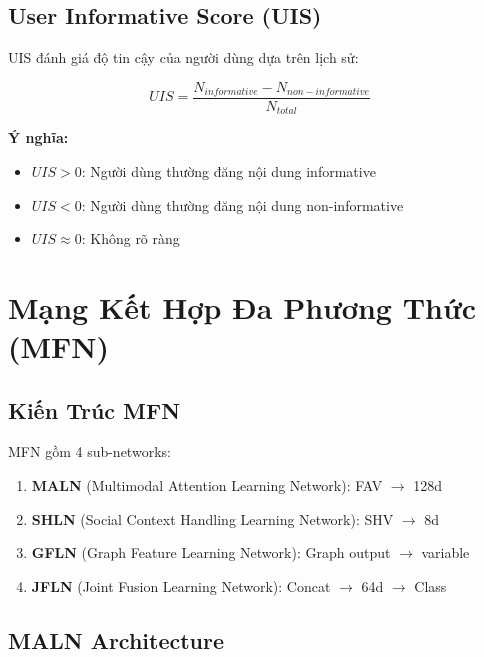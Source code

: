 \documentclass[12pt,a4paper]{article}
\begin{document}
\subsection{User Informative Score (UIS)}

UIS đánh giá độ tin cậy của người dùng dựa trên lịch sử:

\begin{equation}
UIS = \frac{N_{informative} - N_{non-informative}}{N_{total}}
\label{eq:uis}
\end{equation}

\textbf{Ý nghĩa:}
\begin{itemize}
    \item $UIS > 0$: Người dùng thường đăng nội dung informative
    \item $UIS < 0$: Người dùng thường đăng nội dung non-informative
    \item $UIS \approx 0$: Không rõ ràng
\end{itemize}

\section{Mạng Kết Hợp Đa Phương Thức (MFN)}

\subsection{Kiến Trúc MFN}

MFN gồm 4 sub-networks:

\begin{enumerate}
    \item \textbf{MALN} (Multimodal Attention Learning Network): FAV $\rightarrow$ 128d
    \item \textbf{SHLN} (Social Context Handling Learning Network): SHV $\rightarrow$ 8d
    \item \textbf{GFLN} (Graph Feature Learning Network): Graph output $\rightarrow$ variable
    \item \textbf{JFLN} (Joint Fusion Learning Network): Concat $\rightarrow$ 64d $\rightarrow$ Class
\end{enumerate}

\subsection{MALN Architecture}
\end{document}
